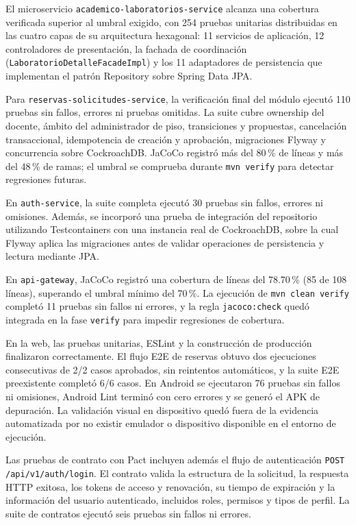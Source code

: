 El microservicio \texttt{academico-laboratorios-service} alcanza una
cobertura verificada superior al umbral exigido, con 254 pruebas
unitarias distribuidas en las cuatro capas de su arquitectura
hexagonal: 11 servicios de aplicación, 12 controladores de
presentación, la fachada de coordinación (\texttt{LaboratorioDetalleFacadeImpl})
y los 11 adaptadores de persistencia que implementan el patrón
Repository sobre Spring Data JPA.

Para \texttt{reservas-solicitudes-service}, la verificación final del
módulo ejecutó 110 pruebas sin fallos, errores ni pruebas omitidas. La
suite cubre ownership del docente, ámbito del administrador de piso,
transiciones y propuestas, cancelación transaccional, idempotencia de
creación y aprobación, migraciones Flyway y concurrencia sobre
CockroachDB. JaCoCo registró más del 80\,\% de líneas y más del
48\,\% de ramas; el umbral se comprueba durante \texttt{mvn verify} para
detectar regresiones futuras.

En \texttt{auth-service}, la suite completa ejecutó 30 pruebas sin fallos,
errores ni omisiones. Además, se incorporó una prueba de integración del
repositorio utilizando Testcontainers con una instancia real de CockroachDB,
sobre la cual Flyway aplica las migraciones antes de validar operaciones de
persistencia y lectura mediante JPA.

En \texttt{api-gateway}, JaCoCo registró una cobertura de líneas del
78.70\,\% (85 de 108 líneas), superando el umbral mínimo del 70\,\%.
La ejecución de \texttt{mvn clean verify} completó 11 pruebas sin fallos
ni errores, y la regla \texttt{jacoco:check} quedó integrada en la fase
\texttt{verify} para impedir regresiones de cobertura.

En la web, las pruebas unitarias, ESLint y la construcción de producción
finalizaron correctamente. El flujo E2E de reservas obtuvo dos ejecuciones
consecutivas de 2/2 casos aprobados, sin reintentos automáticos, y la suite
E2E preexistente completó 6/6 casos. En Android se ejecutaron 76 pruebas
sin fallos ni omisiones, Android Lint terminó con cero errores y se generó
el APK de depuración. La validación visual en dispositivo quedó fuera de
la evidencia automatizada por no existir emulador o dispositivo disponible
en el entorno de ejecución.

Las pruebas de contrato con Pact incluyen además el flujo de autenticación
\texttt{POST /api/v1/auth/login}. El contrato valida la estructura de la
solicitud, la respuesta HTTP exitosa, los tokens de acceso y renovación,
su tiempo de expiración y la información del usuario autenticado, incluidos
roles, permisos y tipos de perfil. La suite de contratos ejecutó seis pruebas
sin fallos ni errores.

